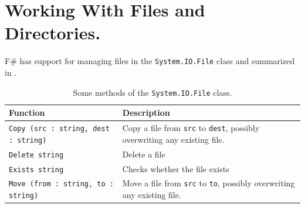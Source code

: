 \documentclass[fsharpNotes.tex]{subfiles}
\begin{document}
\section{Working With Files and Directories.}
F\# has support for managing files in the \lstinline!System.IO.File! class and summarized in .%
%
%
%
%
\begin{table}
  \begin{center}
    \begin{tabularx}{\linewidth}{|l|X|}
      \hline
      \rowcolor{headerRowColor} Function & Description\\
      \hline
      \lstinline{Copy (src : string, dest : string)} & Copy a file from \lstinline{src} to \lstinline{dest}, possibly overwriting any existing file.\\
      \hline
      \lstinline{Delete string} & Delete a file\\
      \hline
      \lstinline{Exists string} & Checks whether the file exists\\
      \hline
      \lstinline{Move (from : string, to : string)} & Move a file from \lstinline{src} to \lstinline{to}, possibly overwriting any existing file.\\
      \hline
    \end{tabularx}
  \end{center}
  \caption{Some methods of the \lstinline!System.IO.File! class.}
  \label{tab:File.Others}
\end{table}
\end{document}
